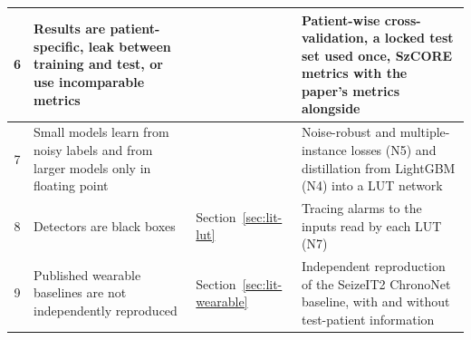 \begin{xltabular}{\textwidth}{|c|P{45mm}|L|L|}
\small 6 & \small Results are patient-specific, leak between training and test, or use incomparable metrics & \small \cite{brookshire2024leakage,ziyabari2017metrics,dan2025szcorechallenge} & \small Patient-wise cross-validation, a locked test set used once, SzCORE metrics with the paper's metrics alongside\\ \hline
\small 7 & \small Small models learn from noisy labels and from larger models only in floating point & \small \cite{shama2026bundl,zheng2023kdgnn} & \small Noise-robust and multiple-instance losses (N5) and distillation from LightGBM (N4) into a LUT network\\ \hline
\small 8 & \small Detectors are black boxes & \small Section~\ref{sec:lit-lut} & \small Tracing alarms to the inputs read by each LUT (N7)\\ \hline
\small 9 & \small Published wearable baselines are not independently reproduced & \small Section~\ref{sec:lit-wearable} & \small Independent reproduction of the SeizeIT2 ChronoNet baseline, with and without test-patient information\\ \hline

\end{xltabular}
